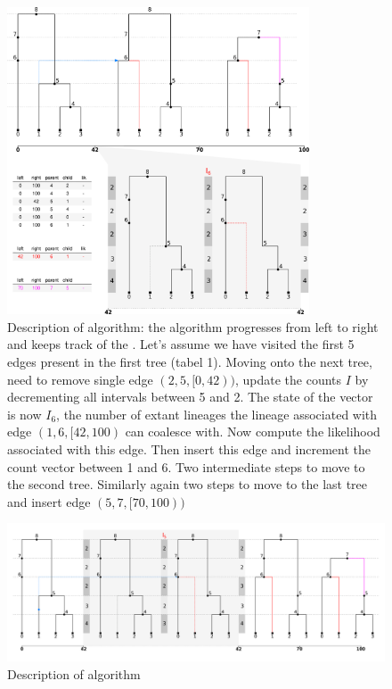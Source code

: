 \documentclass{article}
\begin{document}
\begin{figure}[h!] \label{fig:algo}
\centering
\includegraphics[width=0.8\textwidth]{figures/smc_algo.png}
\caption{Description of algorithm: the algorithm progresses from left to right and 
keeps track of the . Let's assume we have visited the first 5 edges present in the 
first tree (tabel 1). Moving onto the next tree, need to remove single edge 
$(2, 5, [0,42))$, update the counts $I$ by decrementing all intervals between 5 and 
2. The state of the vector is now $I_6$, the number of extant lineages the lineage 
associated with edge $(1, 6, [42, 100)$ can coalesce with. Now compute the likelihood 
associated with this edge. Then insert this edge and increment the count vector between 
1 and 6. Two intermediate steps to move to the second tree. Similarly again two steps 
to move to the last tree and insert edge $(5, 7, [70,100))$
}

\end{figure}

\begin{figure}[h!] \label{fig:algo-flat}
\centering
\includegraphics[width=\textwidth]{figures/smc_algo_flat.png}
\caption{Description of algorithm}
\end{figure}
\end{document}
